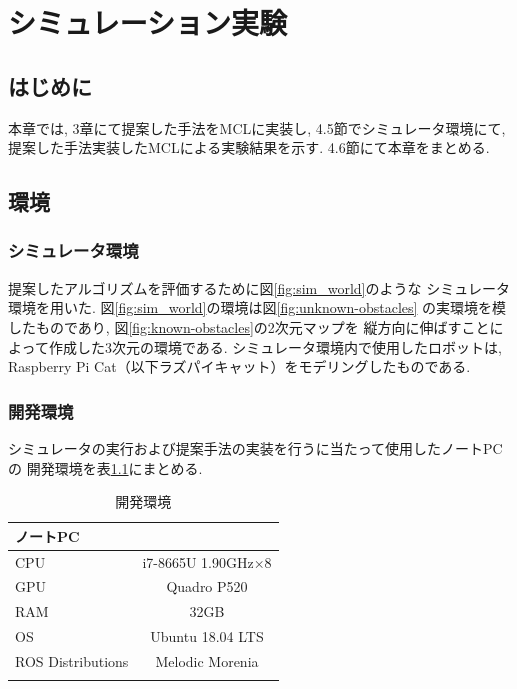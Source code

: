 \chapter{シミュレーション実験}\label{chap:simulation_experiment}

\section{はじめに}
本章では, 3章にて提案した手法をMCLに実装し, 
4.5節でシミュレータ環境にて, 提案した手法実装したMCLによる実験結果を示す. 
4.6節にて本章をまとめる. 

\section{環境}

\subsection{シミュレータ環境}

提案したアルゴリズムを評価するために図\ref{fig:sim_world}のような
シミュレータ環境を用いた. 図\ref{fig:sim_world}の環境は図\ref{fig:unknown-obstacles}
の実環境を模したものであり, 図\ref{fig:known-obstacles}の2次元マップを
縦方向に伸ばすことによって作成した3次元の環境である. 
シミュレータ環境内で使用したロボットは, 
Raspberry Pi Cat（以下ラズパイキャット）をモデリングしたものである. 

\subsection{開発環境}
シミュレータの実行および提案手法の実装を行うに当たって使用したノートPCの
開発環境を表\ref{tabule:pc_spec_sim}にまとめる. 

\begin{table}[ht]
  \caption{開発環境}
  \label{tabule:pc_spec_sim}
  \begin{center}
    \begin{tabular}{l|c} 
      \thline
      ノートPC& \\
      \hline
      CPU & i7-8665U 1.90GHz×8 \\
      GPU & Quadro P520 \\
      RAM & 32GB  \\
      OS & Ubuntu 18.04 LTS \\
      ROS Distributions & Melodic Morenia \\ 
      \thline
    \end{tabular}
  \end{center}
\end{table}


